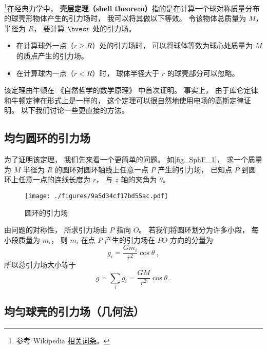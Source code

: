 

\footnote{参考 Wikipedia \href{https://en.wikipedia.org/wiki/Shell_theorem}{相关词条}。}在经典力学中， \textbf{壳层定理（shell theorem）}指的是在计算一个球对称质量分布的球壳形物体产生的引力场时， 我可以将其做以下等效。 令该物体总质量为 $M$， 半径为 $R$， 要计算 $\bvec r$ 处的引力场。
\begin{itemize}
\item 在计算球外一点（$r \geqslant R$）处的引力场时， 可以将球体等效为球心处质量为 $M$ 的质点产生的引力场。
\item 在计算球内一点（$r < R$）时， 球体半径大于 $r$ 的球壳部分可以忽略。
\end{itemize}

该定理由牛顿在 《自然哲学的数学原理》 中首次证明。 事实上， 由于库仑定律和牛顿定律在形式上是一样的， 这个定理可以很自然地使用电场的高斯定律证明。 以下我们讨论一些更直接的方法。

\subsection{均匀圆环的引力场}
为了证明该定理， 我们先来看一个更简单的问题。 如\autoref{fig_SphF_1}， 求一个质量为 $M$ 半径为 $R$ 的圆环对圆环轴线上任意一点 $P$ 产生的引力场， 已知点 $P$ 到圆环上任意一点的连线长度为 $r$， 与 $z$ 轴的夹角为 $\theta$。

\begin{figure}[ht]
\centering
\texttt{[image: ./figures/9a5d34cf17bd55ac.pdf]}
\caption{圆环的引力场} \label{fig_SphF_1}
\end{figure}

由问题的对称性， 所求引力场由 $P$ 指向 $O$。 若我们将圆环划分为许多小段， 每小段质量为 $m_i$， 则 $m_i$ 在点 $P$ 产生的引力场在 $PO$ 方向的分量为
\begin{equation}
g_i = \frac{Gm_i}{r^2}\cos\theta~,
\end{equation}
所以总引力场大小等于
\begin{equation}\label{eq_SphF_2}
g = \sum_i g_i = \frac{GM}{r^2}\cos\theta~.
\end{equation}

\subsection{均匀球壳的引力场（几何法）}\label{sub_SphF_1}

